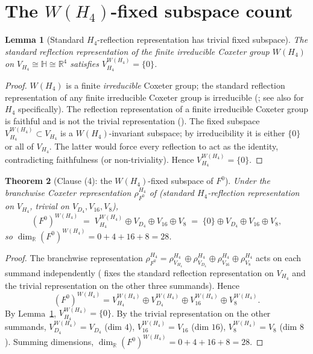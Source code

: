 \documentclass[11pt]{article}
\newcommand{\HH}{\mathbb{H}}
\newcommand{\R}{\mathbb{R}}
\newtheorem{theorem}{Theorem}[section]
\newtheorem{lemma}[theorem]{Lemma}
\theoremstyle{definition}
\begin{document}
\section{The $W(H_4)$-fixed subspace count}
\label{sec:fixed}

\begin{lemma}[Standard $H_4$-reflection representation has trivial
fixed subspace]
\label{lem:H4-fixed}
The standard reflection representation of the finite irreducible
Coxeter group $W(H_4)$ on $V_{H_4} \cong \HH \cong \R^{4}$
satisfies $V_{H_4}^{W(H_4)} = \{0\}$.
\end{lemma}

\begin{proof}
$W(H_4)$ is a finite \emph{irreducible} Coxeter group; the
standard reflection representation of any finite irreducible
Coxeter group is irreducible (\cite[Ch.~5]{Humphreys}; see also
\cite[Ch.~2]{Humphreys} for $H_4$ specifically). The reflection
representation of a finite irreducible Coxeter group is faithful
and is not the trivial representation
(\cite[Ch.~5]{Humphreys}). The fixed subspace
$V_{H_4}^{W(H_4)} \subset V_{H_4}$ is a $W(H_4)$-invariant
subspace; by irreducibility it is either $\{0\}$ or all of
$V_{H_4}$. The latter would force every reflection to act as
the identity, contradicting faithfulness (or non-triviality).
Hence $V_{H_4}^{W(H_4)} = \{0\}$.
\end{proof}

\begin{theorem}[Clause (4): the $W(H_4)$-fixed subspace of $F^0$]
\label{thm:fixed-dim}
Under the branchwise Coxeter representation $\rho_{F^0}^{H_4}$ of
\cite[Definition~\texttt{def:coxeter}]{RefinementSpaces}
(standard $H_4$-reflection representation on $V_{H_4}$, trivial
on $V_{D_4}, V_{16}, V_8$),
\[
  (F^0)^{W(H_4)}
  \;=\; V_{H_4}^{W(H_4)} \oplus V_{D_4} \oplus V_{16} \oplus V_8
  \;=\; \{0\} \oplus V_{D_4} \oplus V_{16} \oplus V_8,
\]
so $\dim_{\R} (F^0)^{W(H_4)} = 0 + 4 + 16 + 8 = 28$.
\end{theorem}

\begin{proof}
The branchwise representation
$\rho_{F^0}^{H_4} = \rho_{V_{H_4}}^{H_4} \oplus
\rho_{V_{D_4}}^{H_4} \oplus \rho_{V_{16}}^{H_4} \oplus
\rho_{V_8}^{H_4}$ acts on each summand independently
(\cite[Definition~\texttt{def:coxeter}]{RefinementSpaces} fixes
the standard reflection representation on $V_{H_4}$ and the
trivial representation on the other three summands). Hence
\[
  (F^0)^{W(H_4)}
  = V_{H_4}^{W(H_4)} \oplus V_{D_4}^{W(H_4)} \oplus
    V_{16}^{W(H_4)} \oplus V_{8}^{W(H_4)}.
\]
By Lemma~\ref{lem:H4-fixed}, $V_{H_4}^{W(H_4)} = \{0\}$.
By the trivial representation on the other summands,
$V_{D_4}^{W(H_4)} = V_{D_4}$ (dim $4$),
$V_{16}^{W(H_4)} = V_{16}$ (dim $16$),
$V_{8}^{W(H_4)} = V_{8}$ (dim $8$). Summing dimensions,
$\dim_{\R} (F^0)^{W(H_4)} = 0 + 4 + 16 + 8 = 28$.
\end{proof}
\end{document}
